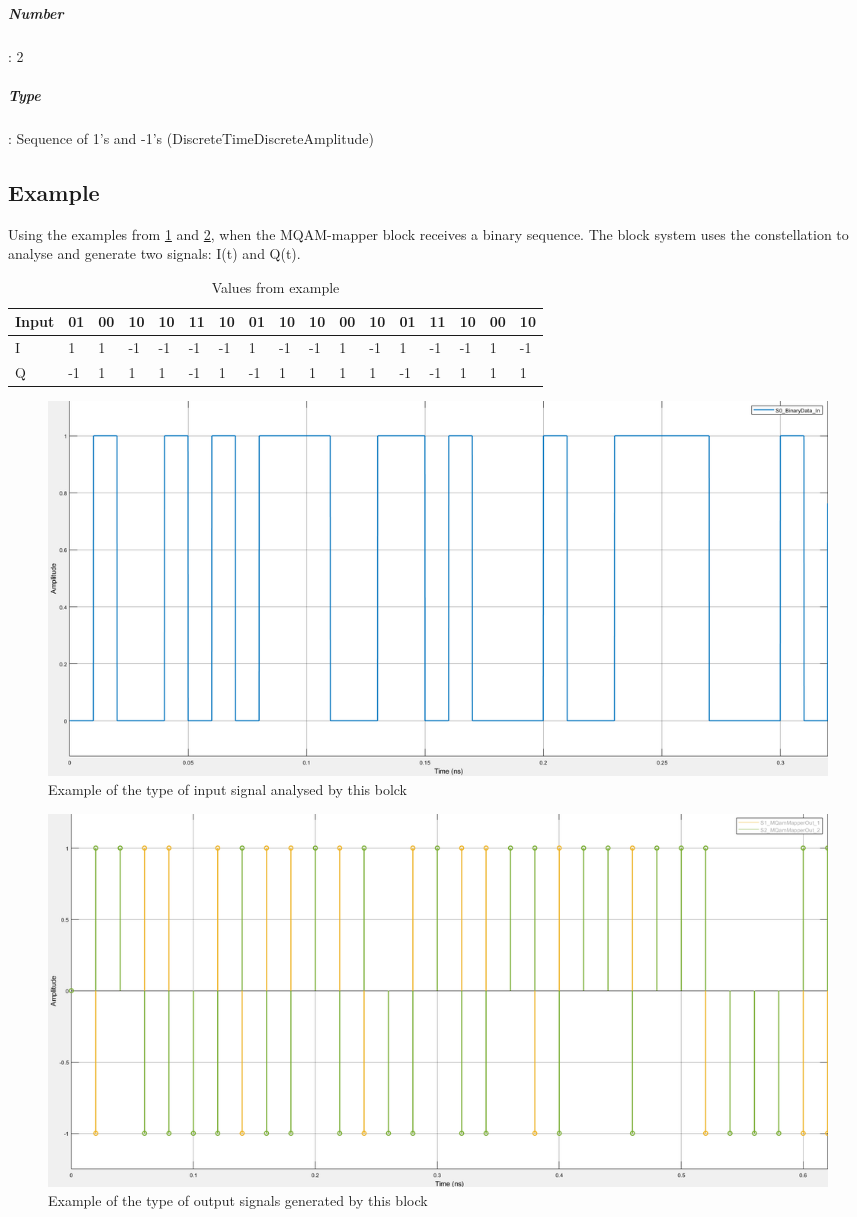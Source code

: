 \subparagraph*{Number}: 2

\subparagraph*{Type}: Sequence of 1's and -1's (DiscreteTimeDiscreteAmplitude)
\pagebreak
\subsection*{Example}
Using the examples from \ref{MQAMinput} and \ref{MQAMoutputs}, when the MQAM-mapper block receives a binary sequence. The block system uses the constellation to analyse and generate two signals: I(t) and Q(t).
\\
\begin{table}[htb]
\caption{Values from example}\label{valuesMQAM}
\centering
\begin{tabular}{|l|l|l|l|l|l|l|l|l|l|l|l|l|l|l|l|l|}
\hline
Input & 01 & 00 & 10 & 10 & 11 & 10 & 01 & 10 & 10 & 00 & 10 & 01 & 11 & 10 & 00 & 10\\ \hline
I & 1 & 1 & -1 & -1 & -1 & -1 & 1 & -1 & -1 & 1 & -1 & 1 & -1 & -1 & 1 & -1 \\ \hline
Q & -1 & 1 & 1 & 1 & -1 & 1 & -1 & 1 & 1 & 1 & 1 & -1 & -1 & 1 & 1 & 1 \\ \hline
\end{tabular}
\end{table}

\begin{figure}[hbtp]
\centering
\includegraphics[scale=0.35]{./lib/m_qam_mapper/figures/S0.PNG}
\caption{Example of the type of input signal analysed by this bolck}\label{MQAMinput}
\end{figure}

\begin{figure}[h]
\centering
\includegraphics[scale=0.35]{./lib/m_qam_mapper/figures/S1_S2.PNG}
\caption{Example of the type of output signals generated by this block}\label{MQAMoutputs}
\end{figure}



